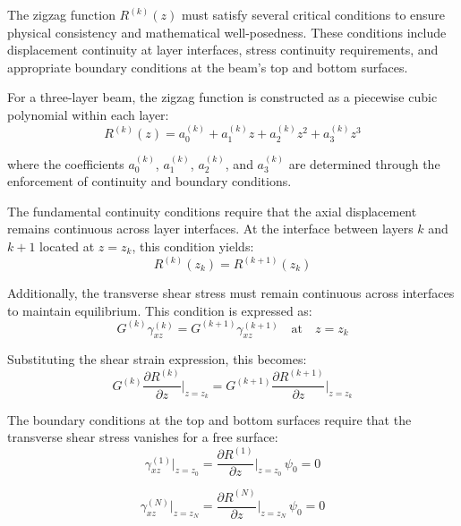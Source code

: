 \documentclass[12pt,a4paper]{report}
\begin{document}
The zigzag function $R^{(k)}(z)$ must satisfy several critical conditions to ensure physical consistency and mathematical well-posedness. These conditions include displacement continuity at layer interfaces, stress continuity requirements, and appropriate boundary conditions at the beam's top and bottom surfaces.

For a three-layer beam, the zigzag function is constructed as a piecewise cubic polynomial within each layer:
\begin{equation}
R^{(k)}(z) = a_0^{(k)} + a_1^{(k)} z + a_2^{(k)} z^2 + a_3^{(k)} z^3
\end{equation}

where the coefficients $a_0^{(k)}$, $a_1^{(k)}$, $a_2^{(k)}$, and $a_3^{(k)}$ are determined through the enforcement of continuity and boundary conditions.

The fundamental continuity conditions require that the axial displacement remains continuous across layer interfaces. At the interface between layers $k$ and $k+1$ located at $z = z_k$, this condition yields:
\begin{equation}
R^{(k)}(z_k) = R^{(k+1)}(z_k)
\end{equation}

Additionally, the transverse shear stress must remain continuous across interfaces to maintain equilibrium. This condition is expressed as:
\begin{equation}
G^{(k)} \gamma_{xz}^{(k)} = G^{(k+1)} \gamma_{xz}^{(k+1)} \quad \text{at} \quad z = z_k
\end{equation}

Substituting the shear strain expression, this becomes:
\begin{equation}
G^{(k)} \frac{\partial R^{(k)}}{\partial z}\bigg|_{z=z_k} = 
G^{(k+1)} \frac{\partial R^{(k+1)}}{\partial z}\bigg|_{z=z_k}
\end{equation}

The boundary conditions at the top and bottom surfaces require that the transverse shear stress vanishes for a free surface:
\begin{equation}
\gamma_{xz}^{(1)}\bigg|_{z=z_0} = \frac{\partial R^{(1)}}{\partial z}\bigg|_{z=z_0} \, \psi_0 = 0
\end{equation}

\begin{equation}
\gamma_{xz}^{(N)}\bigg|_{z=z_N} = \frac{\partial R^{(N)}}{\partial z}\bigg|_{z=z_N} \, \psi_0 = 0
\end{equation}
\end{document}

